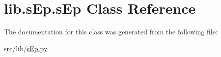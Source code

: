 \hypertarget{classlib_1_1s_ep_1_1s_ep}{\section{lib.\-s\-Ep.\-s\-Ep Class Reference}
\label{classlib_1_1s_ep_1_1s_ep}
}


The documentation for this class was generated from the following file\-:\begin{DoxyCompactItemize}
\item 
src/lib/\hyperlink{s_ep_8py}{s\-Ep.\-py}\end{DoxyCompactItemize}
